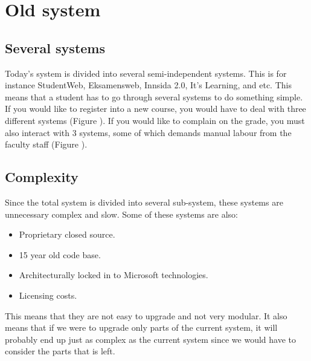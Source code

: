 \section{Old system}
\subsection{Several systems}
Today's system is divided into several semi-independent systems. This is for instance StudentWeb, Eksamensweb, Innsida 2.0, It's Learning, and etc. This means that a student has to go through several systems to do something simple. If you would like to register into a new course, you would have to deal with three different systems (Figure \pageref{fig:Register-old}). If you would like to complain on the grade, you must also interact with 3 systems, some of which demands manual labour from the faculty staff (Figure \pageref{fig:Complain-old}).
\subsection{Complexity}Since the total system is divided into several sub-system, these systems are unnecessary complex and slow. Some of these systems are also:
\begin{itemize}
\item Proprietary closed source.
\item 15 year old code base.
\item Architecturally locked in to Microsoft technologies.
\item Licensing costs.
\end{itemize}This means that they are not easy to upgrade and not very modular. It also means that if we were to upgrade only parts of the current system, it will probably end up just as complex as the current system since we would have to consider the parts that is left.